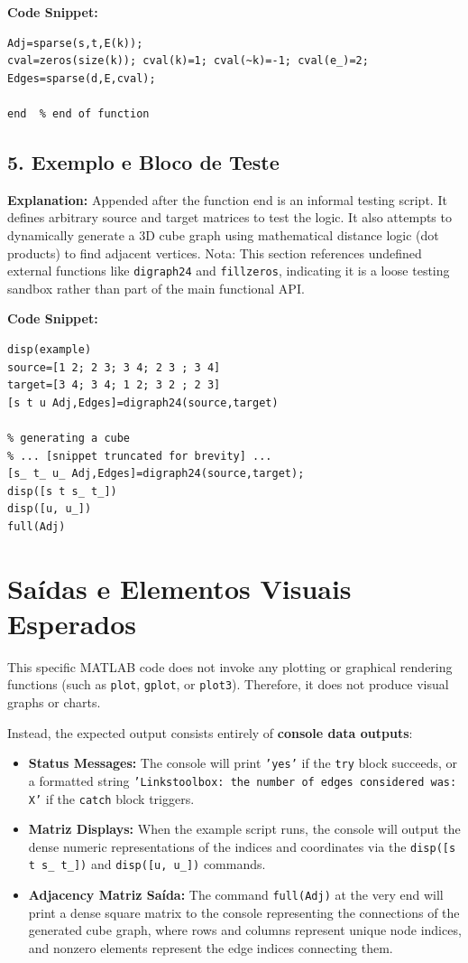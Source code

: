 \textbf{Code Snippet:}
\begin{lstlisting}
Adj=sparse(s,t,E(k));
cval=zeros(size(k)); cval(k)=1; cval(~k)=-1; cval(e_)=2;
Edges=sparse(d,E,cval);

end  % end of function
\end{lstlisting}

\subsection{5. Exemplo e Bloco de Teste}
\textbf{Explanation:}
Appended after the function end is an informal testing script. It defines arbitrary source and target matrices to test the logic. It also attempts to dynamically generate a 3D cube graph using mathematical distance logic (dot products) to find adjacent vertices. Nota: This section references undefined external functions like \texttt{digraph24} and \texttt{fillzeros}, indicating it is a loose testing sandbox rather than part of the main functional API.

\textbf{Code Snippet:}
\begin{lstlisting}
disp(example)
source=[1 2; 2 3; 3 4; 2 3 ; 3 4]
target=[3 4; 3 4; 1 2; 3 2 ; 2 3]
[s t u Adj,Edges]=digraph24(source,target)

% generating a cube
% ... [snippet truncated for brevity] ...
[s_ t_ u_ Adj,Edges]=digraph24(source,target);
disp([s t s_ t_])
disp([u, u_])
full(Adj)
\end{lstlisting}

\section{Saídas e Elementos Visuais Esperados}

This specific MATLAB code does not invoke any plotting or graphical rendering functions (such as \texttt{plot}, \texttt{gplot}, or \texttt{plot3}). Therefore, it does not produce visual graphs or charts.

Instead, the expected output consists entirely of \textbf{console data outputs}:
\begin{itemize}
\item \textbf{Status Messages:} The console will print \texttt{'yes'} if the \texttt{try} block succeeds, or a formatted string \texttt{'Linkstoolbox: the number of edges considered was: X'} if the \texttt{catch} block triggers.
\item \textbf{Matriz Displays:} When the example script runs, the console will output the dense numeric representations of the indices and coordinates via the \texttt{disp([s t s\_ t\_])} and \texttt{disp([u, u\_])} commands.
\item \textbf{Adjacency Matriz Saída:} The command \texttt{full(Adj)} at the very end will print a dense square matrix to the console representing the connections of the generated cube graph, where rows and columns represent unique node indices, and nonzero elements represent the edge indices connecting them.
\end{itemize}
